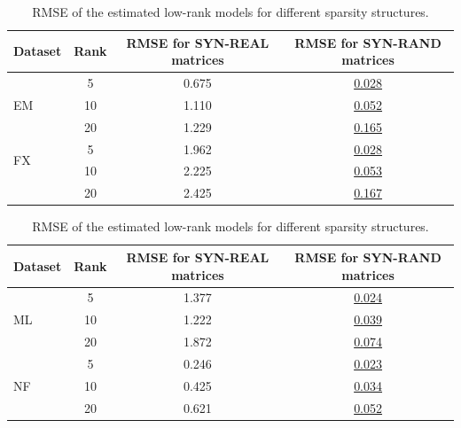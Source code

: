 \begin{table}[bt]
  \caption{RMSE of the estimated low-rank models for different sparsity structures.} 
  \label{table:ch:matcomp:rmse_table}
  \begin{tabular}[t]{lccc}
    \hline
    Dataset
    &\multicolumn{1}{p{0.75cm}}{\centering Rank}
    &\multicolumn{1}{p{1.85cm}}{\centering RMSE for SYN-REAL matrices} 
    &\multicolumn{1}{p{1.85cm}}{\centering RMSE for SYN-RAND matrices} \\
    \hline
    \multirow{3}{*}{EM}  & 5 & 0.675 & \underline{0.028} \\
                          & 10 & 1.110 & \underline{0.052}\\
                          & 20 & 1.229 & \underline{0.165} \\
    \hline
    \multirow{2}{*}{FX} & 5 & 1.962 & \underline{0.028}  \\
                           & 10 & 2.225 & \underline{0.053} \\
                           & 20 & 2.425 & \underline{0.167} \\
    \hline
  \end{tabular}
  \hfill
  \begin{tabular}[t]{lccc}
    \hline
    Dataset
    &\multicolumn{1}{p{0.75cm}}{\centering Rank}
    &\multicolumn{1}{p{1.85cm}}{\centering RMSE for SYN-REAL matrices} 
    &\multicolumn{1}{p{1.85cm}}{\centering RMSE for SYN-RAND matrices} \\
    \hline
    \multirow{3}{*}{ML} & 5  & 1.377 & \underline{0.024} \\
                           & 10 & 1.222 & \underline{0.039}\\
                           & 20 & 1.872 & \underline{0.074}\\
    \hline
    \multirow{3}{*}{NF}   & 5 & 0.246 & \underline{0.023} \\
                           & 10 & 0.425 & \underline{0.034} \\
                           & 20 & 0.621 & \underline{0.052}\\
    \hline
  \end{tabular}
\end{table}

